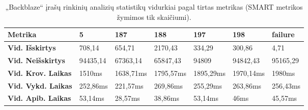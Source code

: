 \documentclass{VUMIFPSkursinis}
\begin{document}
\begin{table}[H]
\centering
\caption{„Backblaze“ įrašų rinkinių analizių statistikų vidurkiai pagal tirtas metrikas (SMART metrikos žymimos tik skaičiumi).}
\label{tab:timeAvg}
{\begin{tabular}{|l|l|l|l|l|l|l|}
\hline
\textbf{Metrika} 		   & 5        & 187       & 188       & 197       & 198       & failure  \\ \hline
\textbf{Vid. Išskirtys}    & 708,14   & 654,71    & 2170,43   & 334,29    & 300,86    & 4,71     \\ \hline
\textbf{Vid. Neišskirtys}  & 94435,14 & 67363,14  & 65847,43  & 94809     & 94842,43  & 95165,29 \\ \hline
\textbf{Vid. Krov. Laikas} & 1510ms   & 1638,71ms & 1795,57ms & 1895,29ms & 1970,14ms & 1980ms   \\ \hline
\textbf{Vid. Vykd. Laikas} & 252,86ms & 221,57ms  & 269,86ms  & 255,29ms  & 263,86ms  & 256,43ms \\ \hline
\textbf{Vid. Apib. Laikas} & 53,14ms  & 28,57ms   & 38,86ms   & 53,14ms   & 46ms      & 45,57ms  \\ \hline
\end{tabular}}
\end{table}
\end{document}
